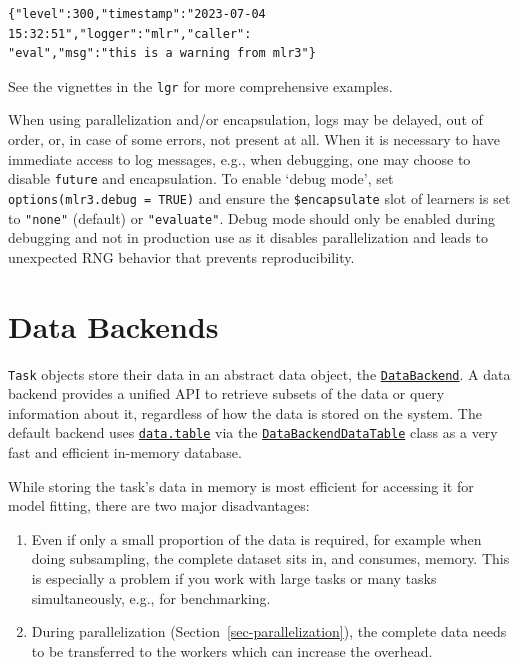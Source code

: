 \begin{verbatim}
{"level":300,"timestamp":"2023-07-04 15:32:51","logger":"mlr","caller":
"eval","msg":"this is a warning from mlr3"}
\end{verbatim}

\begin{Shaded}
\begin{Highlighting}[]
\SpecialCharTok{$}\NormalTok{(}\NormalTok{)}
\end{Highlighting}
\end{Shaded}

See the vignettes in the \texttt{lgr} for more comprehensive examples.

When using parallelization and/or encapsulation, logs may be delayed,
out of order, or, in case of some errors, not present at all. When it is
necessary to have immediate access to log messages, e.g., when
debugging, one may choose to disable \texttt{future} and encapsulation.
To enable `debug mode', set \texttt{options(mlr3.debug\ =\ TRUE)} and
ensure the \texttt{\$encapsulate} slot of learners is set to
\texttt{"none"} (default) or \texttt{"evaluate"}. Debug mode should only
be enabled during debugging and not in production use as it disables
parallelization and leads to unexpected RNG behavior that prevents
reproducibility.

\hypertarget{sec-backends}{%
\section{Data Backends}\label{sec-backends}}

\texttt{Task} objects store their data in an abstract data object, the
\href{https://mlr3.mlr-org.com/reference/DataBackend.html}{\texttt{DataBackend}}.
A data backend provides a unified API to retrieve
subsets of the data or query information about it, regardless of how the
data is stored on the system. The default backend uses
\href{https://cran.r-project.org/package=data.table}{\texttt{data.table}}
via the
\href{https://mlr3.mlr-org.com/reference/DataBackendDataTable.html}{\texttt{DataBackendDataTable}}
class as a very fast and efficient in-memory database.

While storing the task's data in memory is most efficient for accessing
it for model fitting, there are two major disadvantages:

\begin{enumerate}
\def\labelenumi{\arabic{enumi}.}
\tightlist
\item
  Even if only a small proportion of the data is required, for example
  when doing subsampling, the complete dataset sits in, and consumes,
  memory. This is especially a problem if you work with large tasks or
  many tasks simultaneously, e.g., for
  benchmarking.
\item
  During parallelization (Section~\ref{sec-parallelization}), the
  complete data needs to be transferred to the workers which can
  increase the overhead.
\end{enumerate}

